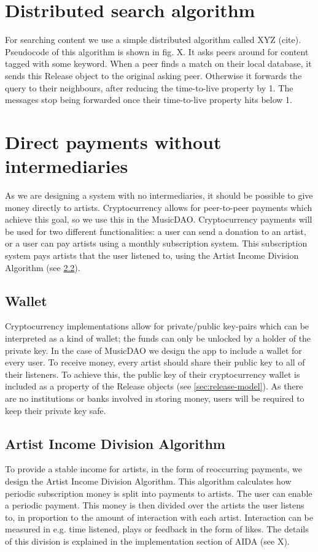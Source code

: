 \section{Distributed search algorithm}
For searching content we use a simple distributed algorithm called XYZ (cite). Pseudocode of this algorithm is shown in fig. X. It asks peers around for content tagged with some keyword. When a peer finds a match on their local database, it sends this Release object to the original asking peer. Otherwise it forwards the query to their neighbours, after reducing the time-to-live property by 1. The messages stop being forwarded once their time-to-live property hits below 1. 

\section{Direct payments without intermediaries}
As we are designing a system with no intermediaries, it should be possible to give money directly to artists. Cryptocurrency allows for peer-to-peer payments which achieve this goal, so we use this in the MusicDAO. Cryptocurrency payments will be used for two different functionalities: a user can send a donation to an artist, or a user can pay artists using a monthly subscription system. This subscription system pays artists that the user listened to, using the Artist Income Division Algorithm (see \ref{sec:aida-design}).

\subsection{Wallet}
Cryptocurrency implementations allow for private/public key-pairs which can be interpreted as a kind of wallet; the funds can only be unlocked by a holder of the private key. In the case of MusicDAO we design the app to include a wallet for every user. To receive money, every artist should share their public key to all of their listeners. To achieve this, the public key of their cryptocurrency wallet is included as a property of the Release objects (see \ref{sec:release-model}). As there are no institutions or banks involved in storing money, users will be required to keep their private key safe.

\subsection{Artist Income Division Algorithm}
\label{sec:aida-design}
To provide a stable income for artists, in the form of reoccurring payments, we design the Artist Income Division Algorithm. This algorithm calculates how periodic subscription money is split into payments to artists. The user can enable a periodic payment. This money is then divided over the artists the user listens to, in proportion to the amount of interaction with each artist. Interaction can be measured in e.g. time listened, plays or feedback in the form of likes. The details of this division is explained in the implementation section of AIDA (see X).
